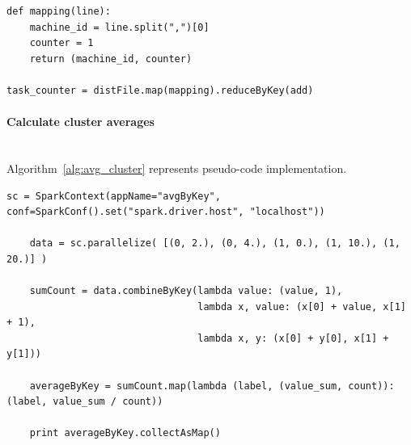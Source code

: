 \documentclass[]{final_report}
\newcommand{\myparagraph}[1]{\paragraph{#1}\mbox{}\\}
\begin{document}
\begin{minipage}{\linewidth}
\begin{lstlisting}[label={jobs_per_day},caption={Aggregated CPU and memory implementation in Apache Spark},frame=single] 
def mapping(line):
    machine_id = line.split(",")[0]
    counter = 1
    return (machine_id, counter)

task_counter = distFile.map(mapping).reduceByKey(add)
\end{lstlisting}
\end{minipage}

\myparagraph{Calculate cluster averages}

Algorithm~\ref{alg:avg_cluster} represents pseudo-code implementation.

\begin{algorithm}[h]
\caption{}
\label{alg:avg_cluster}
 \algrenewcommand{}
 \algrenewcommand{}
\end{algorithm}

\begin{minipage}{\linewidth}
\begin{lstlisting}[label={avg_cluster},caption={Example code for averages in Apache Spark},frame=single] 
    sc = SparkContext(appName="avgByKey", conf=SparkConf().set("spark.driver.host", "localhost"))

    data = sc.parallelize( [(0, 2.), (0, 4.), (1, 0.), (1, 10.), (1, 20.)] )

    sumCount = data.combineByKey(lambda value: (value, 1),
                                 lambda x, value: (x[0] + value, x[1] + 1),
                                 lambda x, y: (x[0] + y[0], x[1] + y[1]))

    averageByKey = sumCount.map(lambda (label, (value_sum, count)): (label, value_sum / count))

    print averageByKey.collectAsMap()
\end{lstlisting}
\end{minipage}
\end{document}

